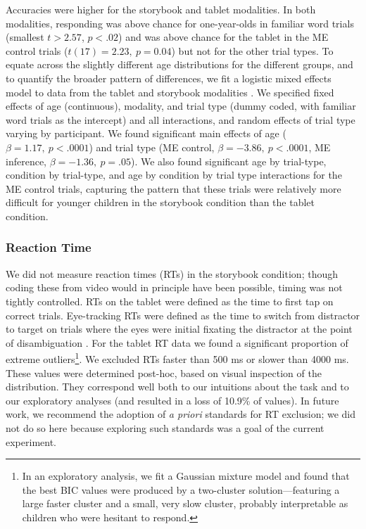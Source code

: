 \documentclass[man,noapacite]{apa2}
\begin{document}
Accuracies were higher for the storybook and tablet modalities. In both modalities, responding was above chance for one-year-olds in familiar word trials (smallest $t > 2.57$, $p < .02$) and was above chance for the tablet in the ME control trials ($t(17) = 2.23,~p = 0.04$) but not for the other trial types. To equate across the slightly different age distributions for the different groups, and to quantify the broader pattern of differences, we fit a logistic mixed effects model to data from the tablet and storybook modalities \cite{jaeger2008}. We specified fixed effects of age (continuous), modality, and trial type (dummy coded, with familiar word trials as the intercept) and all interactions, and random effects of trial type varying by participant. We found significant main effects of age ($\beta = 1.17,~p < .0001$) and trial type (ME control, $\beta = -3.86,~p <.0001$, ME inference, $\beta = -1.36,~p = .05$). We also found significant age by trial-type, condition by trial-type, and age by condition by trial type interactions for the ME control trials, capturing the pattern that these trials were relatively more difficult for younger children in the storybook condition than the tablet condition.

\subsubsection{Reaction Time}

We did not measure reaction times (RTs) in the storybook condition; though coding these from video would in principle have been possible, timing was not tightly controlled. RTs on the tablet were defined as the time to first tap on correct trials. Eye-tracking RTs were defined as the time to switch from distractor to target on trials where the eyes were initial fixating the distractor at the point of disambiguation \cite<for more details, see>{fernald2008}. For the tablet RT data we found a significant proportion of extreme outliers\footnote{In an exploratory analysis, we fit a Gaussian mixture model and found that the best BIC values were produced by a two-cluster solution---featuring a large faster cluster and a small, very slow cluster, probably interpretable as children who were hesitant to respond.}. We excluded RTs faster than 500 ms or slower than 4000 ms. These values were determined post-hoc, based on visual inspection of the distribution. They correspond well both to our intuitions about the task and to our exploratory analyses (and resulted in a loss of 10.9\% of values). In future work, we recommend the adoption of {\it a priori} standards for RT exclusion; we did not do so here because exploring such standards was a goal of the current experiment. 
\end{document}

